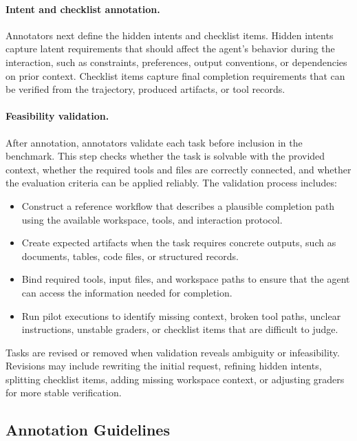 \documentclass{llmxive}
\begin{document}
\paragraph{Intent and checklist annotation.}
Annotators next define the hidden intents and checklist items. Hidden intents capture latent requirements that should affect the agent's behavior during the interaction, such as constraints, preferences, output conventions, or dependencies on prior context. Checklist items capture final completion requirements that can be verified from the trajectory, produced artifacts, or tool records.

\paragraph{Feasibility validation.}
After annotation, annotators validate each task before inclusion in the benchmark. This step checks whether the task is solvable with the provided context, whether the required tools and files are correctly connected, and whether the evaluation criteria can be applied reliably. The validation process includes:
\begin{itemize}[leftmargin=10pt, topsep=0pt, itemsep=1pt, partopsep=1pt, parsep=1pt]
    \item Construct a reference workflow that describes a plausible completion path using the available workspace, tools, and interaction protocol.
    \item Create expected artifacts when the task requires concrete outputs, such as documents, tables, code files, or structured records.
    \item Bind required tools, input files, and workspace paths to ensure that the agent can access the information needed for completion.
    \item Run pilot executions to identify missing context, broken tool paths, unclear instructions, unstable graders, or checklist items that are difficult to judge.
\end{itemize}
Tasks are revised or removed when validation reveals ambiguity or infeasibility. Revisions may include rewriting the initial request, refining hidden intents, splitting checklist items, adding missing workspace context, or adjusting graders for more stable verification.

\subsection{Annotation Guidelines}
\label{app:annotation_guidelines}
\end{document}
